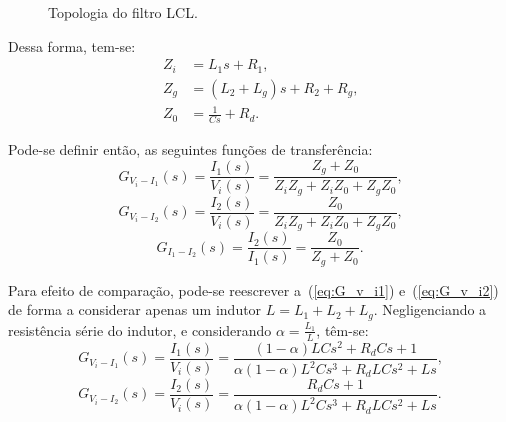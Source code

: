     \begin{figure}[htb]
        \centering{
            \def\svgwidth{\textwidth}
            }
        \renewcommand\figurename{Fig.}
        \caption{Topologia do filtro LCL.}
        \label{fig:LCL_topologia}
    \end{figure}

    Dessa forma, tem-se:
    \begin{equation}
    	\begin{split}
	        Z_i & = L_1s +R_1 \text{,} \\
	        Z_g & = (L_2 + L_g)s + R_2 + R_g \text{,} \\
	        Z_0 & = \frac{1}{Cs} + R_d \text{.}
	    \end{split}
    \end{equation}

    Pode-se definir então, as seguintes funções de transferência:
    \begin{equation}
        G_{V_i-I_1}(s) = \frac{I_1(s)}{V_i(s)} = \frac{Z_g + Z_0}{Z_iZ_g
        	+ Z_iZ_0 + Z_gZ_0} \text{,}
        \label{eq:G_v_i1}
    \end{equation}
    \begin{equation}
        G_{V_i-I_2}(s) = \frac{I_2(s)}{V_i(s)} = \frac{Z_0}{Z_iZ_g
        	+ Z_iZ_0 + Z_gZ_0} \text{,}
        \label{eq:G_v_i2}
    \end{equation}
    \begin{equation}
        G_{I_1-I_2}(s) = \frac{I_2(s)}{I_1(s)} = \frac{Z_0}{Z_g + Z_0}
        	 \text{.}
        \label{eq:G_i1_i2}
    \end{equation}

    Para efeito de comparação, pode-se reescrever a~(\ref{eq:G_v_i1})
    e~(\ref{eq:G_v_i2}) de forma a considerar apenas um indutor
    $L = L_1 + L_2 + L_g$. Negligenciando a resistência série do indutor,
    e considerando $\alpha = \frac{L_1}{L}$, têm-se:
    \begin{equation}
        G_{V_i-I_1}(s) = \frac{I_1(s)}{V_i(s)} =
        	\frac{(1-\alpha)LCs^2+R_dCs+1}{\alpha(1-\alpha)L^2Cs^3+R_dLCs^2+Ls} \text{,}
    \end{equation}
    \begin{equation}
        G_{V_i-I_2}(s) = \frac{I_2(s)}{V_i(s)} =
        	\frac{R_dCs+1}{\alpha(1-\alpha)L^2Cs^3+R_dLCs^2+Ls}  \text{.}
        \label{eq:G_v_i2_2}
    \end{equation}

